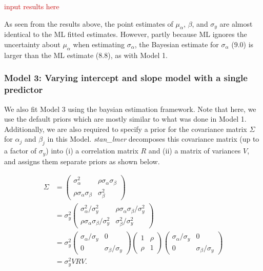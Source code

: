 \textcolor{red}{input results here}

As seen from the results above, the point estimates of $\mu_{\alpha}$, $\beta$, and $\sigma_{y}$ are almost identical to the ML fitted estimates. However, partly because ML ignores the uncertainty about $\mu_{\alpha}$ when estimating $\sigma_{\alpha}$, the Bayesian estimate for $\sigma_{\alpha}$ ($9.0$) is larger than the ML estimate ($8.8$), as with Model 1.

\subsubsection*{Model 3: Varying intercept and slope model with a single predictor}

We also fit Model 3 using the baysian estimation framework.  Note that here, we use the default priors which are mostly similar to what was done in Model 1.  Additionally, we are also required to specify a prior for the covariance matrix $\Sigma$ for $\alpha_j$ and $\beta_j$ in this Model.  \textit{stan\_lmer} decomposes this covariance matrix (up to a factor of $\sigma_y$) into (i) a correlation matrix $R$ and (ii) a matrix of variances $V$, and assigns them separate priors as shown below.


\begin{align}
\Sigma &= 
\left(\begin{matrix} 
\sigma_\alpha^2 & \rho\sigma_\alpha \sigma_\beta \\ 
\rho\sigma_\alpha\sigma_\beta&\sigma_\beta^2 
\end{matrix} \right)\\ &= 
\sigma_y^2\left(\begin{matrix} 
\sigma_\alpha^2/\sigma_y^2 & \rho\sigma_\alpha \sigma_\beta/\sigma_y^2 \\ 
\rho\sigma_\alpha\sigma_\beta/\sigma_y^2 & \sigma_\beta^2/\sigma_y^2 
\end{matrix} \right)\\ &= 
\sigma_y^2\left(\begin{matrix} 
\sigma_\alpha/\sigma_y & 0 \\ 
0&\sigma_\beta/\sigma_y
\end{matrix} \right)
\left(\begin{matrix} 
1 & \rho\\ 
\rho&1 
\end{matrix} \right)
\left(\begin{matrix} 
\sigma_\alpha/\sigma_y & 0 \\ 
0&\sigma_\beta/\sigma_y 
\end{matrix} \right)\\ 
&= \sigma_y^2VRV.
\end{align}


